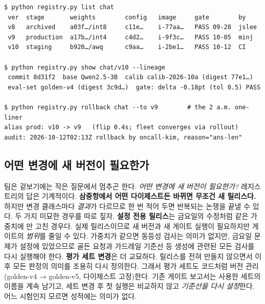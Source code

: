 \begin{terminalbox}
\begin{Verbatim}[breaklines=true,breakanywhere=true,fontsize=\small,formatcom=\color{tbbtermfg},codes=\tbbcodeactive]
$ python registry.py list chat
 ver  stage       weights        config   image     gate        by
 v8   archived    a03f…/int8     c11e…    i-77aa…   PASS 09-28  jslee
 v9   production  a17b…/int4     c4d2…    i-9f3c…   PASS 10-05  minj
 v10  staging     b920…/awq      c9aa…    i-2be1…   PASS 10-12  CI

$ python registry.py show chat/v10 --lineage
 commit 8d31f2  base Qwen2.5-3B  calib calib-2026-10a (digest 77e1…)
 eval-set golden-v4 (digest 3c9d…)  gate: delta -0.18pt (tol 0.5) PASS

$ python registry.py rollback chat --to v9        # the 2 a.m. one-liner
alias prod: v10 -> v9   (flip 0.4s; fleet converges via rollout)
audit: 2026-10-12T02:13Z rollback by oncall-kim, reason="ans-len"
\end{Verbatim}
\end{terminalbox}

\subsection*{어떤 변경에 새 버전이 필요한가}

팀은 겉보기에는 작은 질문에서 멈추곤 한다. \textit{어떤 변경에 새 버전이 필요한가?} 레지스트리의 답은 기계적이다. \textbf{삼중항에서 어떤 다이제스트든 바뀌면 무조건 새 릴리스다.} 하지만 변경 클래스마다 \textit{결과}가 다르므로 한 번 적어 두면 반복되는 논쟁을 끝낼 수 있다. 두 가지 미묘한 경우를 따로 짚자. \textbf{설정 전용 릴리스}는 금요일의 수정처럼 같은 가중치에 만 고친 경우다. 실제 릴리스이므로 새 버전과 새 게이트 실행이 필요하지만 게이트의 \textit{범위}를 줄일 수 있다. 가중치가 같으면 동등성 검사는 의미가 없지만, 금요일 문제가 설정에 있었으므로 골든 요청과 가드레일 기준선 등 생성에 관련된 모든 검사를 다시 실행해야 한다. \textbf{평가 세트 변경}은 더 교묘하다. 릴리스를 전혀 만들지 않으면서 이후 모든 판정의 의미를 조용히 다시 정의한다. 그래서 평가 세트도 코드처럼 버전 관리(golden-v4 → golden-v5, 다이제스트 고정)한다. 기존 게이트 보고서는 사용한 세트의 이름을 계속 남기고, 세트 변경 후 첫 실행은 비교하지 않고 \textit{기준선을 다시 설정}한다. 어느 시험인지 모르면 성적에는 의미가 없다.

